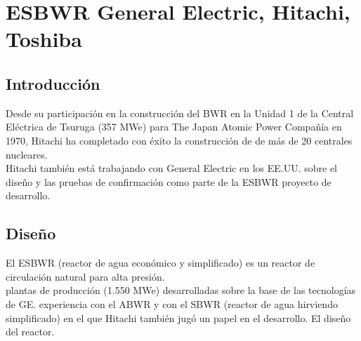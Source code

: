\documentclass[]{article}
\begin{document}
\section{ESBWR General Electric, Hitachi, Toshiba}

\subsection{Introducción}

Desde su participación en la construcción del BWR en la Unidad 1 de la Central Eléctrica de Tsuruga (357 MWe) para The Japan Atomic Power Compañía en 1970, Hitachi ha completado con éxito la construcción de de más de 20 centrales nucleares.\\


 Hitachi también está trabajando con General Electric
en los EE.UU. sobre el diseño y las pruebas de confirmación como parte de la ESBWR
proyecto de desarrollo.\citep{Matsuura2009}\\

\subsection{Diseño}
El ESBWR (reactor de agua económico y simplificado) es un reactor de circulación natural para alta presión.\\

plantas de producción (1.550 MWe) desarrolladas sobre la base de las tecnologías de GE.
experiencia con el ABWR y con el SBWR
(reactor de agua hirviendo simplificado) en el que Hitachi
también jugó un papel en el desarrollo. El diseño del reactor.\citep{Matsuura2009}\\
\end{document}
